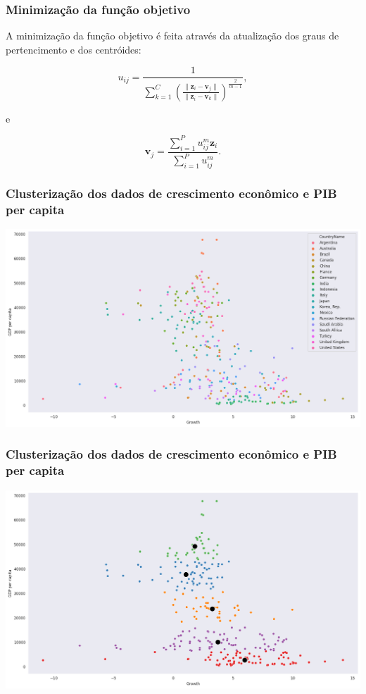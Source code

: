 \documentclass{beamer}
\begin{document}
\begin{frame}
\frametitle{Minimização da função objetivo}

A minimização da função objetivo é feita através da atualização dos graus de pertencimento e dos centróides:

\begin{equation}
u_{ij} = \frac{1}{\sum_{k=1}^C \left( \frac{\| \mathbf z_i - \mathbf v_j \|}{\| \mathbf z_i - \mathbf v_k \|} \right)^{\frac{2}{m-1}}},
\end{equation}

e

\begin{equation}
  \mathbf v_j = \frac{\sum_{i=1}^P u_{ij}^m \mathbf z_i}{\sum_{i=1}^P u_{ij}^m}.
  \end{equation}
\end{frame}

\begin{frame}
\frametitle{Clusterização dos dados de crescimento econômico e PIB per capita}
\center\includegraphics[width=\textwidth]{scatter.png}
\end{frame}

\begin{frame}
\frametitle{Clusterização dos dados de crescimento econômico e PIB per capita}
\center\includegraphics[width=\textwidth]{scatter-cluster.png}
\end{frame}
\end{document}
